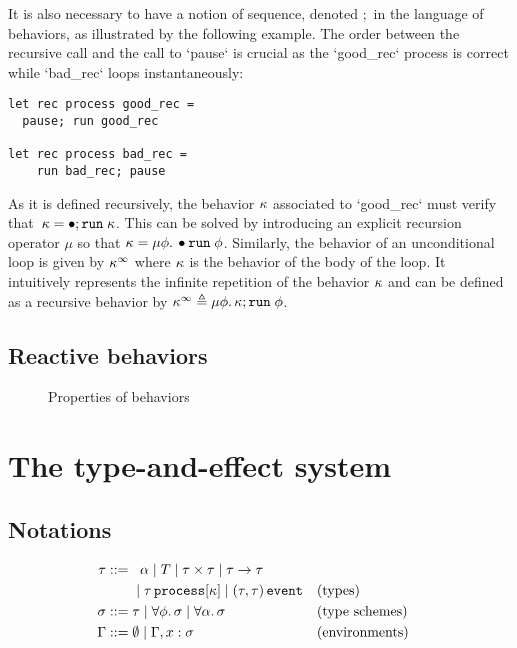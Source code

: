 \documentclass[9pt,preprint]{sigplanconf}
\newcommand{\deq}{\triangleq}
\newcommand{\sdeq}{::=}
\begin{document}
It is also necessary to have a notion of sequence, denoted $;$ in the language of behaviors, as illustrated by the following example. The order between the recursive call and the call to `pause` is crucial as the `good_rec` process is correct while `bad_rec` loops instantaneously:
\begin{lstlisting}
let rec process good_rec =
  pause; run good_rec

let rec process bad_rec =
    run bad_rec; pause
\end{lstlisting}
As it is defined recursively, the behavior  $\kappa$  associated to `good_rec` must verify that~$ \kappa = \bullet ; \mathtt{run}\; \kappa$. This can be solved by introducing an explicit recursion operator $\mu$ so that $\kappa = \mu \phi.\, \bullet{\mathtt{run}\; \phi}$. Similarly, the behavior of an unconditional loop is given by $\kappa^\infty$ where $\kappa$ is the behavior of the body of the loop. It intuitively represents the infinite repetition of the behavior $\kappa$ and can be defined as a recursive behavior by $\effinf{\rk} \deq \effrec{\effvar}{\effcon{\rk}{\effrun{\effvar}}}$. 

\subsection{Reactive behaviors}

\begin{figure*}



\caption{Properties of behaviors}
\end{figure*}


\section{The type-and-effect system}

\subsection{Notations}

\begin{align*}
\rt \sdeq &\;\;\; \rtvar \mid T \mid \rtprod{\rt}{\rt} \mid \rtarrow{\rt}{\rt} \\
    &\;\mid \rtproc{\rt}{\rk} \mid \rtsig{\rt}{\rt} && \text{(types)} \\
\rs \sdeq &\; \rt \mid \forall \effvar.\, \rs \mid \forall \rtvar.\, \rs && \text{(type schemes)} \\
\tyenv \sdeq&\; \emptyset \mid \tyenv \tyconcat x : \rs && \text{(environments)}
\end{align*}
\end{document}
